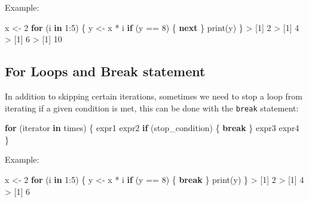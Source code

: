 \documentclass[
]{book}
\newenvironment{Shaded}{\begin{snugshade}}{\end{snugshade}}
\newcommand{\ControlFlowTok}[1]{\textcolor[rgb]{0.13,0.29,0.53}{\textbf{#1}}}
\newcommand{\DecValTok}[1]{\textcolor[rgb]{0.00,0.00,0.81}{#1}}
\newcommand{\FunctionTok}[1]{\textcolor[rgb]{0.00,0.00,0.00}{#1}}
\newcommand{\NormalTok}[1]{#1}
\newcommand{\OtherTok}[1]{\textcolor[rgb]{0.56,0.35,0.01}{#1}}
\newcommand{\SpecialCharTok}[1]{\textcolor[rgb]{0.00,0.00,0.00}{#1}}
\begin{document}
Example:

\begin{Shaded}
\begin{Highlighting}[]
\NormalTok{x }\OtherTok{\textless{}{-}} \DecValTok{2}
\ControlFlowTok{for}\NormalTok{ (i }\ControlFlowTok{in} \DecValTok{1}\SpecialCharTok{:}\DecValTok{5}\NormalTok{) \{}
\NormalTok{  y }\OtherTok{\textless{}{-}}\NormalTok{ x }\SpecialCharTok{*}\NormalTok{ i}
  \ControlFlowTok{if}\NormalTok{ (y }\SpecialCharTok{==} \DecValTok{8}\NormalTok{) \{}
    \ControlFlowTok{next}
\NormalTok{  \}}
  \FunctionTok{print}\NormalTok{(y)}
\NormalTok{\}}
\SpecialCharTok{\textgreater{}}\NormalTok{ [}\DecValTok{1}\NormalTok{] }\DecValTok{2}
\SpecialCharTok{\textgreater{}}\NormalTok{ [}\DecValTok{1}\NormalTok{] }\DecValTok{4}
\SpecialCharTok{\textgreater{}}\NormalTok{ [}\DecValTok{1}\NormalTok{] }\DecValTok{6}
\SpecialCharTok{\textgreater{}}\NormalTok{ [}\DecValTok{1}\NormalTok{] }\DecValTok{10}
\end{Highlighting}
\end{Shaded}

\hypertarget{for-loops-and-break-statement}{%
\subsection{For Loops and Break statement}\label{for-loops-and-break-statement}}

In addition to skipping certain iterations, sometimes we need to stop a loop
from iterating if a given condition is met, this can be done with the \texttt{break}
statement:

\begin{Shaded}
\begin{Highlighting}[]
\ControlFlowTok{for}\NormalTok{ (iterator }\ControlFlowTok{in}\NormalTok{ times) \{ }
\NormalTok{  expr1}
\NormalTok{  expr2}
  \ControlFlowTok{if}\NormalTok{ (stop\_condition) \{}
    \ControlFlowTok{break}
\NormalTok{  \}}
\NormalTok{  expr3}
\NormalTok{  expr4}
\NormalTok{\}}
\end{Highlighting}
\end{Shaded}

Example:

\begin{Shaded}
\begin{Highlighting}[]
\NormalTok{x }\OtherTok{\textless{}{-}} \DecValTok{2}
\ControlFlowTok{for}\NormalTok{ (i }\ControlFlowTok{in} \DecValTok{1}\SpecialCharTok{:}\DecValTok{5}\NormalTok{) \{}
\NormalTok{  y }\OtherTok{\textless{}{-}}\NormalTok{ x }\SpecialCharTok{*}\NormalTok{ i}
  \ControlFlowTok{if}\NormalTok{ (y }\SpecialCharTok{==} \DecValTok{8}\NormalTok{) \{}
    \ControlFlowTok{break}
\NormalTok{  \}}
  \FunctionTok{print}\NormalTok{(y)}
\NormalTok{\}}
\SpecialCharTok{\textgreater{}}\NormalTok{ [}\DecValTok{1}\NormalTok{] }\DecValTok{2}
\SpecialCharTok{\textgreater{}}\NormalTok{ [}\DecValTok{1}\NormalTok{] }\DecValTok{4}
\SpecialCharTok{\textgreater{}}\NormalTok{ [}\DecValTok{1}\NormalTok{] }\DecValTok{6}
\end{Highlighting}
\end{Shaded}
\end{document}

